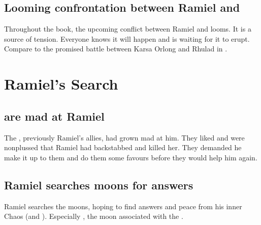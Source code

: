 \subsection{Looming confrontation between Ramiel and \Dasteron}
Throughout the book, the upcoming conflict between Ramiel and \Dasteron looms. 
It is a source of tension. 
Everyone knows it will happen and is waiting for it to erupt. 
Compare to the promised battle between Karsa Orlong and Rhulad in \cite{StevenErikson:ReapersGale}. 














\section{Ramiel's Search}





\subsection{\Vorcanths{} are mad at Ramiel}
The , previously Ramiel's allies, had grown mad at him. 
They liked \Shiaraid{} and were nonplussed that Ramiel had backstabbed and killed her. 
They demanded he make it up to them and do them some favours before they would help him again. 





\subsection{Ramiel searches moons for answers}
Ramiel searches the moons, hoping to find answers and peace from his inner Chaos (and ). 
Especially , the moon associated with the . 


